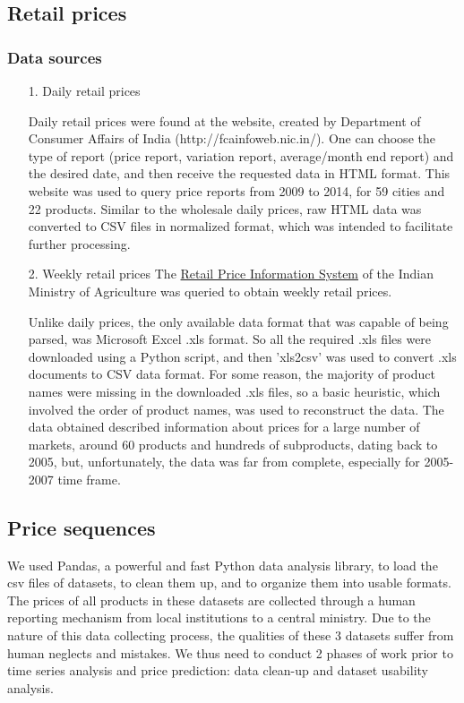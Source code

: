 \subsection*{Retail prices}
\subsubsection*{Data sources}

\begin{itemize}

\item[1.] Daily retail prices

Daily retail prices were found at the website, created by Department of Consumer Affairs of India (http://fcainfoweb.nic.in/). One can choose the type of report (price report, variation report, average/month end report) and the desired date, and then receive the requested data in HTML format. This website was used to query price reports from 2009 to 2014, for 59 cities and 22 products. Similar to the wholesale daily prices, raw HTML data was converted to CSV files in normalized format, which was intended to facilitate further processing.

\item[2.] Weekly retail prices
The \href{http://rpms.dacnet.nic.in/}{Retail Price Information System} of the Indian Ministry of Agriculture was queried to obtain weekly retail prices.\par
Unlike daily prices, the only available data format that was capable of being parsed, was Microsoft Excel .xls format. So all the required .xls files were downloaded using a Python script, and then 'xls2csv' was used to convert .xls documents to CSV data format. For some reason, the majority of product names were missing in the downloaded .xls files, so a basic heuristic, which involved the order of product names, was used to reconstruct the data.
The data obtained described information about prices for a large number of markets, around 60 products and hundreds of subproducts, dating back to 2005, but, unfortunately, the data was far from complete, especially for 2005-2007 time frame.

\end{itemize}

\subsection*{Price sequences}
We used Pandas, a powerful and fast Python data analysis library, to load the csv files of datasets, to clean them up, and to organize them into usable formats. The prices of all products in these datasets are collected through a human reporting mechanism from local institutions to a central ministry. Due to the nature of this data collecting process, the qualities of these 3 datasets suffer from human neglects and mistakes. We thus need to conduct 2 phases of work prior to time series analysis and price prediction: data clean-up and dataset usability analysis.


